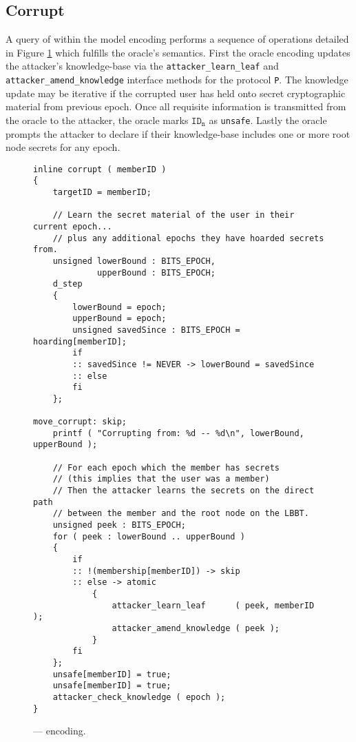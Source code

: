 \hypertarget{corrupt}{%
\subsection{Corrupt}\label{corrupt}}

A query of  within the  model encoding performs a sequence of operations detailed in Figure \ref{fig:Oracle-Corrupt} which fulfills the oracle's semantics.
First the oracle encoding updates the attacker's knowledge-base via the \texttt{attacker\_learn\_leaf} and \texttt{attacker\_amend\_knowledge} interface methods for the protocol \texttt{P}.
The knowledge update may be iterative if the corrupted user has held onto secret cryptographic material from previous epoch.
Once all requisite information is transmitted from the oracle to the attacker, the oracle marks \(\mathtt{ID_n}\) as \texttt{unsafe}.
Lastly the oracle prompts the attacker to declare if their knowledge-base includes one or more  root node secrets for any epoch.

\begin{figure}[h!]
  \centering
  \caption{\label{fig:Oracle-Corrupt}\CGKAmod{}{}{} ---  encoding.}
\begin{verbatim}
inline corrupt ( memberID )
{
    targetID = memberID;

    // Learn the secret material of the user in their current epoch...
    // plus any additional epochs they have hoarded secrets from.
    unsigned lowerBound : BITS_EPOCH,
             upperBound : BITS_EPOCH;
    d_step
    {
        lowerBound = epoch;
        upperBound = epoch;
        unsigned savedSince : BITS_EPOCH = hoarding[memberID];
        if
        :: savedSince != NEVER -> lowerBound = savedSince
        :: else
        fi
    };

move_corrupt: skip;
    printf ( "Corrupting from: %d -- %d\n", lowerBound, upperBound );

    // For each epoch which the member has secrets
    // (this implies that the user was a member)
    // Then the attacker learns the secrets on the direct path
    // between the member and the root node on the LBBT.
    unsigned peek : BITS_EPOCH;
    for ( peek : lowerBound .. upperBound )
    {
        if
        :: !(membership[memberID]) -> skip
        :: else -> atomic
            {
                attacker_learn_leaf      ( peek, memberID );
                attacker_amend_knowledge ( peek );
            }
        fi
    };
    unsafe[memberID] = true;
    unsafe[memberID] = true;
    attacker_check_knowledge ( epoch );
}
\end{verbatim}
\end{figure}

